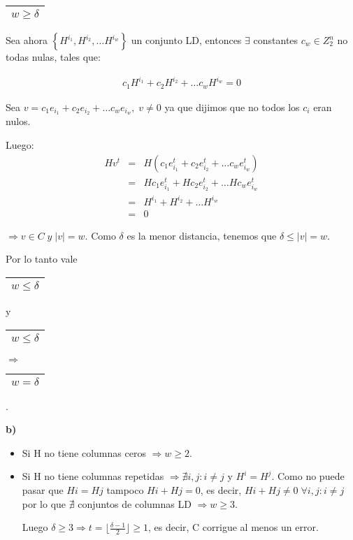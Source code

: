 \documentclass[12pt,a4paper]{report}
\newcounter{neq}
\begin{document}
			\vspace{3mm}
			\begin{tabular}{|c|} \hline $w \geq \delta $ \\\hline \end{tabular} Sea ahora $\left\lbrace H^{i_{1}}, H^{i_{2}}, \dotsc H^{i_{w}} \right\rbrace$ un conjunto LD, entonces $\exists$ constantes $c_{w} \in Z_{2}^{n}$ no todas nulas, tales que:

			\begin{eqnarray}
				\nonumber c_{1} H^{i_{1}} + c_{2} H^{i_{2}} + \dotsc c_{w} H^{i_{w}} = 0
			\end{eqnarray}

			\par Sea $v = c_{1} e_{i_{1}} + c_{2} e_{i_{2}} + \dotsc c_{w} e_{i_{w}} , \; v \neq 0$ ya que dijimos que no todos los $c_{i}$ eran nulos.
			\par Luego:
			\begin{eqnarray}
				\nonumber H v^{t} &=& H (c_{1} e_{i_{1}}^{t} + c_{2} e_{i_{2}}^{t} + \dotsc c_{w} e_{i_{w}}^{t}) \\
				\nonumber &=& H c_{1} e_{i_{1}}^{t} + H c_{2} e_{i_{2}}^{t} + \dotsc H c_{w} e_{i_{w}}^{t} \\
				\nonumber &=& H^{i_{1}} + H^{i_{2}} + \dotsc H^{i_{w}} \\
				\nonumber &=& 0
			\end{eqnarray}
			\par $\Rightarrow v \in C \; y \; \lvert v \rvert = w$. Como $\delta$ es la menor distancia, tenemos que $\delta \leq \lvert v \rvert = w$.

			\vspace{5mm}
			\par Por lo tanto vale \begin{tabular}{|c|} \hline $w \leq \delta $ \\ \hline \end{tabular} y \begin{tabular}{|c|} \hline $w \leq \delta $ \\ \hline \end{tabular} $\Rightarrow$ \begin{tabular}{|c|} \hline $w = \delta $ \\ \hline \end{tabular}.

			\vspace{5mm}
			\textbf{b)}
			\begin{itemize}
				\item Si H no tiene columnas ceros $\Rightarrow w \geq 2$.
				\item Si H no tiene columnas repetidas $\Rightarrow \nexists i,j : i \neq j$ y $H^{i} = H^{j}$. Como no puede pasar que $H{i} = H{j}$ tampoco $H{i} + H{j} = 0$, es decir, $H{i} + H{j} \neq 0 \; \forall i,j : i \neq j$ por lo que $\nexists$ conjuntos de columnas LD $\Rightarrow w \geq 3$.

				\par Luego $\delta \geq 3 \Rightarrow t = \lfloor \frac{\delta-1}{2} \rfloor \geq 1$, es decir, C corrigue al menos un error.
			\end{itemize}
\end{document}
